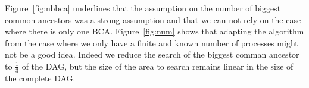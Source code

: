 Figure~\ref{fig:nbbca} underlines that the assumption on the number of biggest common ancestors was a strong assumption and that we can not rely on the case where there is only one BCA. Figure~\ref{fig:num} shows that adapting the algorithm from the case where we only have a finite and known number of processes might not be a good idea. Indeed we reduce the search of the biggest comman ancestor to $\frac{1}{3}$ of the DAG, but the size of the area to search remains linear in the size of the complete DAG.
